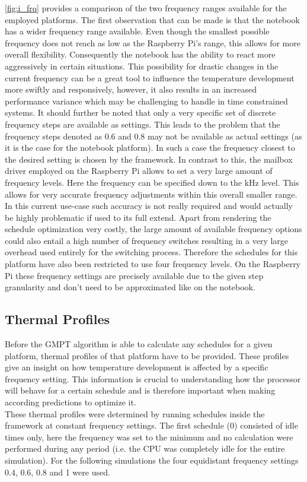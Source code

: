 \autoref{fig:i_frq} provides a comparison of the two frequency ranges available for the employed platforms. The first observation that can be made is that the notebook has a wider frequency range available. Even though the smallest possible frequency does not reach as low as the Raspberry Pi's range, this allows for more overall flexibility. Consequently the notebook has the ability to react more aggressively in certain situations. This possibility for drastic changes in the current frequency can be a great tool to influence the temperature development more swiftly and responsively, however, it also results in an increased performance variance which may be challenging to handle in time constrained systems. It should further be noted that only a very specific set of discrete frequency steps are available as settings. This leads to the problem that the frequency steps denoted as 0.6 and 0.8 may not be available as actual settings (as it is the case for the notebook platform). In such a case the frequency closest to the desired setting is chosen by the framework. In contrast to this, the mailbox driver employed on the Raspberry Pi allows to set a very large amount of frequency levels. Here the frequency can be specified down to the kHz level. This allows for very accurate frequency adjustments within this overall smaller range. In this current use-case such accuracy is not really required and would actually be highly problematic if used to its full extend. Apart from rendering the schedule optimization very costly, the large amount of available frequency options could also entail a high number of frequency switches resulting in a very large overhead used entirely for the switching process. Therefore the schedules for this platform have also been restricted to use four frequency levels. On the Raspberry Pi these frequency settings are precisely available due to the given step granularity and don't need to be approximated like on the notebook.
\subsection{Thermal Profiles}
Before the GMPT algorithm is able to calculate any schedules for a given platform, thermal profiles of that platform have to be provided. These profiles give an insight on how temperature development is affected by a specific frequency setting. This information is crucial to understanding how the processor will behave for a certain schedule and is therefore important when making according predictions to optimize it.\\
\hspace*{0.5ex}\hspace{0.5ex} These thermal profiles were determined by running schedules inside the framework at constant frequency settings. The first schedule (0) consisted of idle times only, here the frequency was set to the minimum and no calculation were performed during any period (i.e. the CPU was completely idle for the entire simulation). For the following simulations the four equidistant frequency settings 0.4, 0.6, 0.8 and 1 were used.\\

